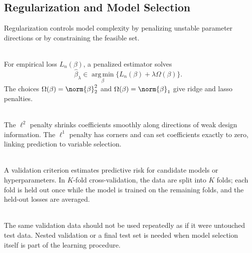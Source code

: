 \subsection{Regularization and Model Selection}

Regularization controls model complexity by penalizing unstable parameter directions or by constraining the feasible set.

\begin{definition} \label{def:sl-penalized-linear-estimator} \\
For empirical loss $L_n(\beta)$, a penalized estimator solves
\[
\widehat{\beta}_{\lambda}\in
\operatorname*{arg\,min}_{\beta}
\{L_n(\beta)+\lambda\Omega(\beta)\}.
\]
The choices $\Omega(\beta)=\norm{\beta}_2^2$ and $\Omega(\beta)=\norm{\beta}_1$ give ridge and lasso penalties.
\end{definition}

\begin{remark} \label{rem:sl-ridge-lasso-geometry} \\
The $\ell^2$ penalty shrinks coefficients smoothly along directions of weak design information.  The $\ell^1$ penalty has corners and can set coefficients exactly to zero, linking prediction to variable selection.
\end{remark}

\begin{definition} \label{def:sl-model-selection-validation} \\
A validation criterion estimates predictive risk for candidate models or hyperparameters.  In $K$-fold cross-validation, the data are split into $K$ folds; each fold is held out once while the model is trained on the remaining folds, and the held-out losses are averaged.
\end{definition}

\begin{remark} \label{rem:sl-selection-bias} \\
The same validation data should not be used repeatedly as if it were untouched test data.  Nested validation or a final test set is needed when model selection itself is part of the learning procedure.
\end{remark}
